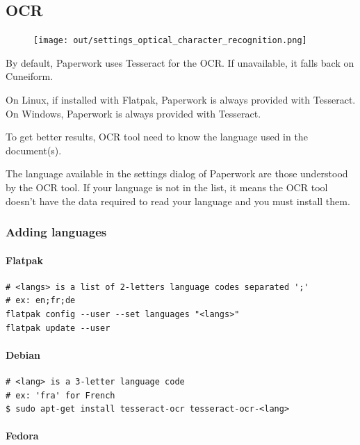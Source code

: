 \documentclass[10pt,a4paper]{article}
\begin{document}
\subsection{OCR}

\begin{figure}[H]
	\texttt{[image: out/settings\_optical\_character\_recognition.png]}
\end{figure}

By default, Paperwork uses Tesseract for the OCR. If unavailable,
it falls back on Cuneiform.

On Linux, if installed with Flatpak, Paperwork is always provided with
Tesseract. On Windows, Paperwork is always provided with Tesseract.

To get better results, OCR tool need to know the language used in
the document(s).

The language available in the settings dialog of Paperwork are those
understood by the OCR tool. If your language is not in the list, it
means the OCR tool doesn't have the data required to read your language
and you must install them.


\subsubsection{Adding languages}

\paragraph{Flatpak}

\begin{verbatim}
# <langs> is a list of 2-letters language codes separated ';'
# ex: en;fr;de
flatpak config --user --set languages "<langs>"
flatpak update --user
\end{verbatim}


\paragraph{Debian}

\begin{verbatim}
# <lang> is a 3-letter language code
# ex: 'fra' for French
$ sudo apt-get install tesseract-ocr tesseract-ocr-<lang>
\end{verbatim}

\paragraph{Fedora}
\end{document}
